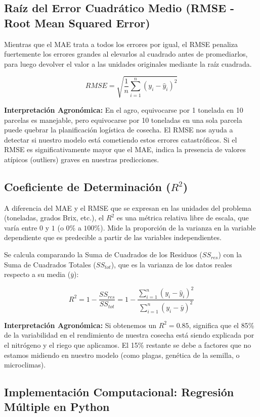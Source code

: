 \documentclass{article}
\begin{document}
\subsection{Raíz del Error Cuadrático Medio (RMSE - Root Mean Squared Error)}
Mientras que el MAE trata a todos los errores por igual, el RMSE penaliza fuertemente los errores grandes al elevarlos al cuadrado antes de promediarlos, para luego devolver el valor a las unidades originales mediante la raíz cuadrada.

$$ RMSE = \sqrt{\frac{1}{n} \sum_{i=1}^{n} (y_i - \hat{y}_i)^2} $$

\textbf{Interpretación Agronómica:} En el agro, equivocarse por 1 tonelada en 10 parcelas es manejable, pero equivocarse por 10 toneladas en una sola parcela puede quebrar la planificación logística de cosecha. El RMSE nos ayuda a detectar si nuestro modelo está cometiendo estos errores catastróficos. Si el RMSE es significativamente mayor que el MAE, indica la presencia de valores atípicos (outliers) graves en nuestras predicciones.

\subsection{Coeficiente de Determinación ($R^2$)}
A diferencia del MAE y el RMSE que se expresan en las unidades del problema (toneladas, grados Brix, etc.), el $R^2$ es una métrica relativa libre de escala, que varía entre $0$ y $1$ (o $0\%$ a $100\%$). Mide la proporción de la varianza en la variable dependiente que es predecible a partir de las variables independientes.

Se calcula comparando la Suma de Cuadrados de los Residuos ($SS_{res}$) con la Suma de Cuadrados Totales ($SS_{tot}$), que es la varianza de los datos reales respecto a su media ($\bar{y}$):

$$ R^2 = 1 - \frac{SS_{res}}{SS_{tot}} = 1 - \frac{\sum_{i=1}^{n} (y_i - \hat{y}_i)^2}{\sum_{i=1}^{n} (y_i - \bar{y})^2} $$

\textbf{Interpretación Agronómica:} Si obtenemos un $R^2 = 0.85$, significa que el 85\% de la variabilidad en el rendimiento de nuestra cosecha está siendo explicada por el nitrógeno y el riego que aplicamos. El 15\% restante se debe a factores que no estamos midiendo en nuestro modelo (como plagas, genética de la semilla, o microclimas).

\subsection{Implementación Computacional: Regresión Múltiple en Python}
\end{document}
